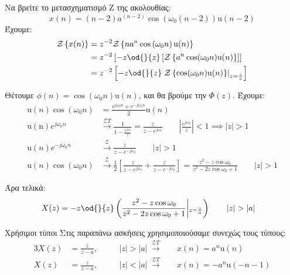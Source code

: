 \documentclass[11pt,a4paper,notitlepage,fleqn]{article}
\begin{document}
\begin{exercise}
	Να βρείτε το μετασχηματισμό Z της ακολουθίας:
	\[
	x(n) = (n-2)a^{(n-2)}\cos\left( \omega_0 (n-2) \right)
	\mathrm{u}(n-2)
	\]
	\tcblower
	Έχουμε:
	\begin{align*}
		\mathcal{Z}\left\lbrace x(n) \right\rbrace&= z^{-2}
		\mathcal{Z} \left\lbrace n a^n \cos\left(\omega_0 n\right) \mathrm{u}(n)\right\rbrace
		\\ &= z^{-2} \left[
		-z \od{}{z} \left[ \mathcal{Z}
		  \left\lbrace a^n\cos(\omega_0 n)\mathrm{u}(n) \right\rbrace
		 \right]
		\right]
		\\ &= z^{-2}\left[
		  -z \od{}{z}\left.\mathcal{Z}\left\lbrace \cos(\omega_0 n)\mathrm{u}(n) \right\rbrace\right|_{z=\frac{z}{a}}
		\right]
	\end{align*}
	
	Θέτουμε \( \phi(n) = \cos(\omega_0 n)\mathrm{u}(n) \), και θα βρούμε την \( \Phi(z) \). Έχουμε:
	\begin{align*}
		\mathrm{u}(n) \cos(\omega_0 n) &= \frac{e^{j\omega_0 n} + e^{-j\omega_0 n}}{2} \mathrm u(n)
		\\
		\mathrm{u(n)} e^{j\omega_0 n }&\xrightarrow{\mathcal{Z} T} \frac{1}{1-\frac{e^{j\omega_0}}{z}}
		= \frac{z}{z-e^{j\omega_0}} \qquad \left| \frac{e^{j\omega_0}}{z} \right| < 1 \implies |z|>1
		\\
		\mathrm{u}(n) e^{-j\omega_0 n}&\xrightarrow{\mathcal{Z}} \frac{z}{z-e^{-j\omega_0}} \qquad |z|>1
		\\
		\mathrm{u}(n) \cos(\omega_0 n)&\xrightarrow{\mathcal{Z}} \frac{1}{2}\left[
		\frac{z}{z-e^{j\omega_0}} + \frac{z}{z-e^{-j\omega_0}}
		\right]
		= \frac{z^2-z\cos\omega_0}{z^2-2z\cos\omega_0 + 1}\qquad |z|>1
	\end{align*}
	
	Άρα τελικά:
	\begin{align*}
		X(z) &= -z\od{}{z} \left(
		\frac{z^2-z\cos\omega_0}{z^2-2z\cos\omega_0+1}\middle|_{z=\frac{z}{a}}
		\right)
		\qquad |z|>|a|
	\end{align*}
\end{exercise}


\begin{infobox}{Χρήσιμοι τύποι}
	Στις παραπάνω ασκήσεις χρησιμοποιούσαμε συνεχώς τους τύπους:
	\begin{alignat*}{3}
		X(z) &= \frac{z}{z-a}, &&\quad |z|>|a|\ \xrightarrow{\mathcal{Z}T}\ && x(n) = a^n\mathrm{u}(n)
		\\
		X(z) &= \frac{z}{z-a}, &&\quad |z|<|a|\ \xrightarrow{\mathcal{Z}T}\ && x(n) = -a^n\mathrm{u}(-n-1)
	\end{alignat*}
\end{infobox}
\end{document}
